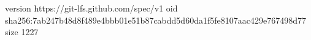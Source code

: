 version https://git-lfs.github.com/spec/v1
oid sha256:7ab247b48d8f489e4bbb01e51b87cabdd5d60da1f5fe8107aac429e767498d77
size 1227
